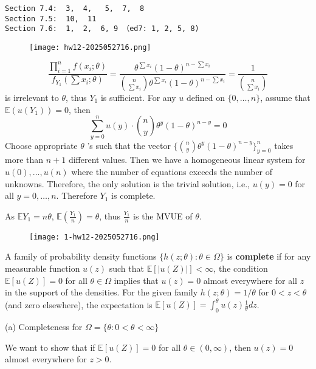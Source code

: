 \begin{lstlisting}
Section 7.4:  3,  4,   5,  7,  8  
Section 7.5:  10,  11  
Section 7.6:  1,  2,  6, 9 （ed7: 1, 2, 5, 8)
\end{lstlisting}
\begin{exercise}
\begin{figure}[H]
\centering
\texttt{[image: hw12-2025052716.png]}
\label{}
\end{figure}
\end{exercise}
\[
\frac{\prod_{i=1}^{n} f(x_i;\theta)}{f_{Y_1}\left( \sum x_i;\theta \right)}=\frac{\theta^{\sum x_i}(1-\theta)^{n-\sum x_i }}{\binom{n}{\sum x_i} \theta^{\sum x_i}(1-\theta)^{n-\sum x_i}}=\frac{1}{\binom{n}{\sum x_i} }
\]
is irrelevant to $\theta$, thus $Y_1$ is sufficient. For any $u$ defined on $\{ 0,\dots,n \}$, assume that $\mathbb{E}(u(Y_1))=0$, then
\[
\sum_{y=0}^{n} u(y) \cdot \binom{n}{y} \theta^{y}(1-\theta)^{n-y}=0
\]
Choose appropriate $\theta$ 's such that the vector $\{ \binom{n}{y}\theta^{y}(1-\theta)^{n-y} \}_{y=0}^{n}$ takes more than $n+1$ different values. Then we have a homogeneous linear system for $u(0), \dots, u(n)$ where the number of equations exceeds the number of unknowns. Therefore, the only solution is the trivial solution, i.e., $u(y) = 0$ for all $y = 0, \dots, n$. Therefore $Y_1$ is complete.

As $\mathbb{E}Y_1=n\theta$, $\mathbb{E}\left( \frac{Y_1}{n} \right)=\theta$, thus $\frac{Y_1}{n}$ is the MVUE of $\theta$.

\begin{exercise}
\begin{figure}[H]
\centering
\texttt{[image: 1-hw12-2025052716.png]}
\label{}
\end{figure}
\end{exercise}
A family of probability density functions $\{h(z;\theta):\theta\in\Omega\}$ is \textbf{complete} if for any measurable function $u(z)$ such that $\mathbb{E}[|u(Z)|] < \infty$, the condition $\mathbb{E}[u(Z)] = 0$ for all $\theta \in \Omega$ implies that $u(z) = 0$ almost everywhere for all $z$ in the support of the densities. For the given family $h(z;\theta) = 1/\theta$ for $0 < z < \theta$ (and zero elsewhere), the expectation is $\mathbb{E}[u(Z)] = \int_0^\theta u(z) \frac{1}{\theta} dz$.

(a) Completeness for $\Omega = \{\theta : 0 < \theta < \infty\}$

We want to show that if $\mathbb{E}[u(Z)] = 0$ for all $\theta \in (0, \infty)$, then $u(z) = 0$ almost everywhere for $z > 0$.


